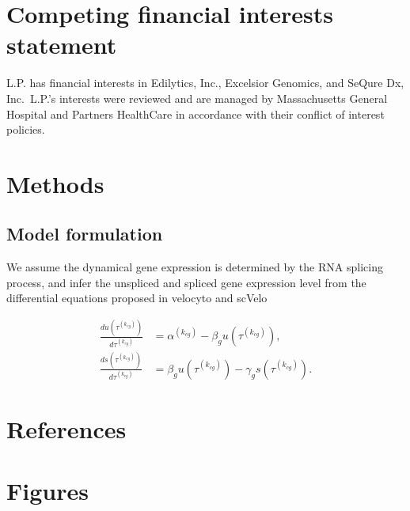 \documentclass[
  sn-mathphys-num,
  lineno,
  twocolumn]{sn-jnl}
\begin{document}
\section{Competing financial interests
statement}\label{competing-financial-interests-statement}

L.P. has financial interests in Edilytics, Inc., Excelsior Genomics, and
SeQure Dx, Inc.~L.P.'s interests were reviewed and are managed by
Massachusetts General Hospital and Partners HealthCare in accordance
with their conflict of interest policies.

\section{Methods}\label{sec-methods}

\subsection{Model formulation}\label{sec-model}

We assume the dynamical gene expression is determined by the RNA
splicing process, and infer the unspliced and spliced gene expression
level from the differential equations proposed in velocyto
\citep{La_Manno2018-lj} and scVelo \citep{Bergen2020-pj}

\begin{align}
\frac{d u\left(\tau^{\left(k_{cg}\right)}\right)}{d \tau^{\left(k_{cg}\right)}}
  &= \alpha^{\left(k_{cg}\right)}-\beta_g u\left(\tau^{\left(k_{cg}\right)}\right), \label{eq-dudt}\\
\frac{d s\left(\tau^{\left(k_{cg}\right)}\right)}{d \tau^{\left(k_{cg}\right)}}
  &= \beta_g u\left(\tau^{\left(k_{cg}\right)}\right)-\gamma_g s\left(\tau^{\left(k_{cg}\right)}\right). \label{eq-dsdt}
\end{align}

\newpage{}

\onecolumn

\section{References}\label{references}

\renewcommand{\bibsection}{}


\FloatBarrier

\newpage{}

\section{Figures}\label{figures}
\end{document}
